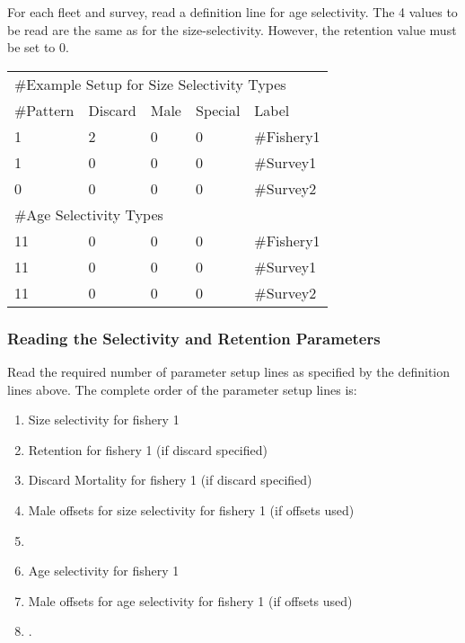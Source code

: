 For each fleet and survey, read a definition line for age selectivity.  The 4 values to be read are the same as for the size-selectivity.  However, the retention value must be set to 0.

\begin{center}
	\begin{longtable}{p{2cm} p{2cm} p{2cm} p{2cm} p{6.5cm} }
		\hline
		\multicolumn{5}{l}{\#Example Setup for Size Selectivity Types}\\
		\#Pattern & Discard & Male & Special & Label \\
		\hline
		1  & 2 & 0 & 0 & \#Fishery1\\
		1  & 0 & 0 & 0 & \#Survey1\\
		0  & 0 & 0 & 0 & \#Survey2\\
		\multicolumn{5}{l}{\#Age Selectivity Types}\\
		\hline
		11  & 0 & 0 & 0 & \#Fishery1\\
		11  & 0 & 0 & 0 & \#Survey1\\
		11  & 0 & 0 & 0 & \#Survey2\\
		\hline
	\end{longtable}
\end{center}

\subsubsection{Reading the Selectivity and Retention Parameters}
Read the required number of parameter setup lines as specified by the definition lines above.  The complete order of the parameter setup lines is:
\begin{enumerate}
	\item Size selectivity for fishery 1
	\item Retention for fishery 1 (if discard specified)
	\item Discard Mortality for fishery 1 (if discard specified)
	\item Male offsets for size selectivity for fishery 1 (if offsets used)
	\item <repeat for additional fleets and surveys>
	\item Age selectivity for fishery 1
	\item Male offsets for age selectivity for fishery 1 (if offsets used)
	\item <repeat for additional fleets and surveys>.
\end{enumerate}


